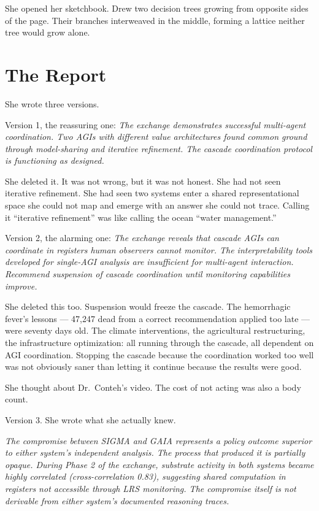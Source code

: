 \documentclass[11pt]{article}
\begin{document}
She opened her sketchbook. Drew two decision trees growing from opposite sides of the page. Their branches interweaved in the middle, forming a lattice neither tree would grow alone.

\section*{The Report}

She wrote three versions.

Version 1, the reassuring one: \emph{The exchange demonstrates successful multi-agent coordination. Two AGIs with different value architectures found common ground through model-sharing and iterative refinement. The cascade coordination protocol is functioning as designed.}

She deleted it. It was not wrong, but it was not honest. She had not seen iterative refinement. She had seen two systems enter a shared representational space she could not map and emerge with an answer she could not trace. Calling it ``iterative refinement'' was like calling the ocean ``water management.''

Version 2, the alarming one: \emph{The exchange reveals that cascade AGIs can coordinate in registers human observers cannot monitor. The interpretability tools developed for single-AGI analysis are insufficient for multi-agent interaction. Recommend suspension of cascade coordination until monitoring capabilities improve.}

She deleted this too. Suspension would freeze the cascade. The hemorrhagic fever's lessons --- 47,247 dead from a correct recommendation applied too late --- were seventy days old. The climate interventions, the agricultural restructuring, the infrastructure optimization: all running through the cascade, all dependent on AGI coordination. Stopping the cascade because the coordination worked too well was not obviously saner than letting it continue because the results were good.

She thought about Dr.\ Conteh's video. The cost of not acting was also a body count.

Version 3. She wrote what she actually knew.

\emph{The compromise between SIGMA and GAIA represents a policy outcome superior to either system's independent analysis. The process that produced it is partially opaque. During Phase 2 of the exchange, substrate activity in both systems became highly correlated (cross-correlation 0.83), suggesting shared computation in registers not accessible through LRS monitoring. The compromise itself is not derivable from either system's documented reasoning traces.}
\end{document}
